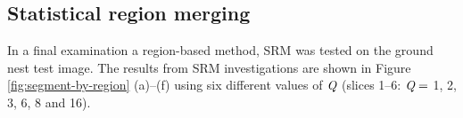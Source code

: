 \subsection{Statistical region merging}\label{sec:statistical-region-merging-in-fiji}
In a final examination a region-based method, \ac{SRM} \cite{Nock2004, Nock2005} was tested on the ground nest test image. The results from \ac{SRM} investigations are shown in Figure \ref{fig:segment-by-region} (a)--(f) using six different values of $\emph{Q}$ (slices 1--6: $\emph{Q}=$ 1, 2, 3, 6, 8 and 16).

\begin{figure}[!htbp]\myfloatalign
{} \\
 \\
 \\
 \\
 \\

\end{figure}
